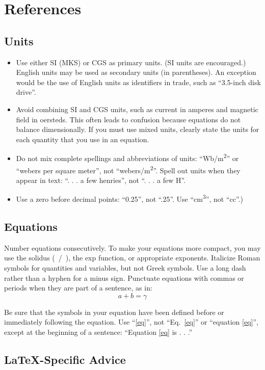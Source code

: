 \documentclass[conference]{IEEEtran}
\begin{document}
\section{References}
\subsection{Units}
\begin{itemize}
\item Use either SI (MKS) or CGS as primary units. (SI units are encouraged.) English units may be used as secondary units (in parentheses). An exception would be the use of English units as identifiers in trade, such as ``3.5-inch disk drive''.
\item Avoid combining SI and CGS units, such as current in amperes and magnetic field in oersteds. This often leads to confusion because equations do not balance dimensionally. If you must use mixed units, clearly state the units for each quantity that you use in an equation.
\item Do not mix complete spellings and abbreviations of units: ``Wb/m\textsuperscript{2}'' or ``webers per square meter'', not ``webers/m\textsuperscript{2}''. Spell out units when they appear in text: ``. . . a few henries'', not ``. . . a few H''.
\item Use a zero before decimal points: ``0.25'', not ``.25''. Use ``cm\textsuperscript{3}'', not ``cc''.)
\end{itemize}

\subsection{Equations}
Number equations consecutively. To make your 
equations more compact, you may use the solidus (~/~), the exp function, or 
appropriate exponents. Italicize Roman symbols for quantities and variables, 
but not Greek symbols. Use a long dash rather than a hyphen for a minus 
sign. Punctuate equations with commas or periods when they are part of a 
sentence, as in:
\begin{equation}
a+b=\gamma\label{eq}
\end{equation}

Be sure that the 
symbols in your equation have been defined before or immediately following 
the equation. Use ``\eqref{eq}'', not ``Eq.~\eqref{eq}'' or ``equation \eqref{eq}'', except at 
the beginning of a sentence: ``Equation \eqref{eq} is . . .''

\subsection{\LaTeX-Specific Advice}
\end{document}
